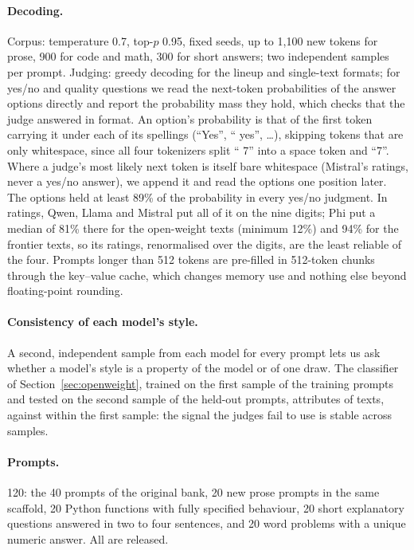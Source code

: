 \paragraph{Decoding.} Corpus: temperature 0.7, top-$p$ 0.95, fixed seeds,
up to 1,100 new tokens for prose, 900 for code and math, 300 for short
answers; two independent samples per prompt. Judging: greedy decoding for the
lineup and single-text formats; for yes/no and quality questions we read the
next-token probabilities of the answer options directly and report the
probability mass they hold, which checks that the judge answered in format.
An option's probability is that of the first token carrying it under each of
its spellings (``Yes'', `` yes'', \ldots), skipping tokens that are only
whitespace, since all four tokenizers split `` 7'' into a space token and
``7''. Where a judge's most likely next token is itself bare whitespace
(Mistral's ratings, never a yes/no answer), we append it and read the
options one position later. The options held at least 89\% of the
probability in every yes/no judgment. In ratings, Qwen, Llama and Mistral put
all of it on the nine digits; Phi put a median of 81\% there for the
open-weight texts (minimum 12\%) and 94\% for the frontier texts, so its
ratings, renormalised over the digits, are the least reliable of the four. Prompts longer than 512 tokens are pre-filled in 512-token chunks
through the key--value cache, which changes memory use and nothing else
beyond floating-point rounding.

\paragraph{Consistency of each model's style.} A second, independent
sample from each model for every prompt lets us ask whether a model's style
is a property of the model or of one draw. The classifier of
Section~\ref{sec:openweight}, trained on the first sample of the training
prompts and tested on the second sample of the held-out prompts, attributes
\OWClfCrossSample{} \OWClfCrossSampleCI{} of texts, against \OWClfPooled{}
within the first sample: the signal the judges fail to use is stable across
samples.



\paragraph{Prompts.} 120: the 40 prompts of the original bank, 20 new prose
prompts in the same scaffold, 20 Python functions with fully specified
behaviour, 20 short explanatory questions answered in two to four sentences,
and 20 word problems with a unique numeric answer. All are released.

